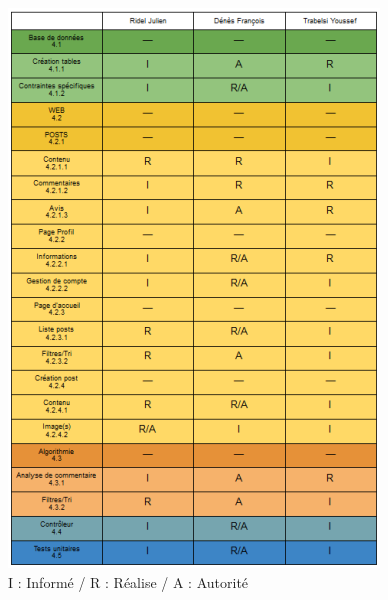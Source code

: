 \documentclass{article}
\begin{document}
\centering \includegraphics[scale=0.5]{MATRICE_RACI.png} \\
\Large I : Informé / R : Réalise / A : Autorité
\end{document}
